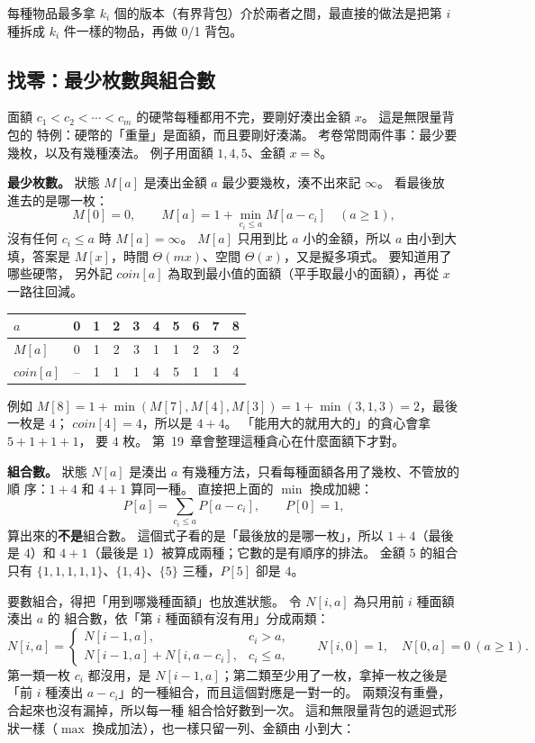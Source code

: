 每種物品最多拿 $k_i$ 個的版本（有界背包）介於兩者之間，最直接的做法是把第 $i$ 種拆成 $k_i$
件一樣的物品，再做 0/1 背包。

\subsection{找零：最少枚數與組合數}
\label{sec:dp-coin}

面額 $c_1 < c_2 < \cdots < c_m$ 的硬幣每種都用不完，要剛好湊出金額 $x$。 這是無限量背包的
特例：硬幣的「重量」是面額，而且要剛好湊滿。 考卷常問兩件事：最少要幾枚，以及有幾種湊法。
例子用面額 $1, 4, 5$、金額 $x = 8$。

\textbf{最少枚數。} 狀態 $M[a]$ 是湊出金額 $a$ 最少要幾枚，湊不出來記 $\infty$。 看最後放
進去的是哪一枚：
\[
M[0] = 0, \qquad M[a] = 1 + \min_{c_i \le a} M[a - c_i] \quad (a \ge 1),
\]
沒有任何 $c_i \le a$ 時 $M[a] = \infty$。 $M[a]$ 只用到比 $a$ 小的金額，所以 $a$ 由小到大
填，答案是 $M[x]$，時間 $\Theta(mx)$、空間 $\Theta(x)$，又是擬多項式。 要知道用了哪些硬幣，
另外記 $\mathit{coin}[a]$ 為取到最小值的面額（平手取最小的面額），再從 $x$ 一路往回減。

\begin{center}
\small
\begin{tabular}{l*{9}{c}}
\toprule
$a$ & 0 & 1 & 2 & 3 & 4 & 5 & 6 & 7 & 8 \\
\midrule
$M[a]$ & 0 & 1 & 2 & 3 & 1 & 1 & 2 & 3 & 2 \\
$\mathit{coin}[a]$ & -- & 1 & 1 & 1 & 4 & 5 & 1 & 1 & 4 \\
\bottomrule
\end{tabular}
\end{center}

例如 $M[8] = 1 + \min(M[7], M[4], M[3]) = 1 + \min(3, 1, 3) = 2$，最後一枚是 $4$；
$\mathit{coin}[4] = 4$，所以是 $4 + 4$。 「能用大的就用大的」的貪心會拿 $5 + 1 + 1 + 1$，
要 $4$ 枚。 第~19~章會整理這種貪心在什麼面額下才對。

\textbf{組合數。} 狀態 $N[a]$ 是湊出 $a$ 有幾種方法，只看每種面額各用了幾枚、不管放的順
序：$1 + 4$ 和 $4 + 1$ 算同一種。 直接把上面的 $\min$ 換成加總：
\[
P[a] = \sum_{c_i \le a} P[a - c_i], \qquad P[0] = 1,
\]
算出來的\textbf{不是}組合數。 這個式子看的是「最後放的是哪一枚」，所以 $1 + 4$（最後是
$4$）和 $4 + 1$（最後是 $1$）被算成兩種；它數的是有順序的排法。 金額 $5$ 的組合只有
$\{1, 1, 1, 1, 1\}$、$\{1, 4\}$、$\{5\}$ 三種，$P[5]$ 卻是 $4$。

要數組合，得把「用到哪幾種面額」也放進狀態。 令 $N[i, a]$ 為只用前 $i$ 種面額湊出 $a$ 的
組合數，依「第 $i$ 種面額有沒有用」分成兩類：
\[
N[i, a] = \begin{cases}
N[i - 1, a], & c_i > a, \\
N[i - 1, a] + N[i, a - c_i], & c_i \le a,
\end{cases}
\qquad N[i, 0] = 1, \quad N[0, a] = 0 \ (a \ge 1).
\]
第一類一枚 $c_i$ 都沒用，是 $N[i - 1, a]$；第二類至少用了一枚，拿掉一枚之後是「前 $i$ 種湊出
$a - c_i$」的一種組合，而且這個對應是一對一的。 兩類沒有重疊，合起來也沒有漏掉，所以每一種
組合恰好數到一次。 這和無限量背包的遞迴式形狀一樣（$\max$ 換成加法），也一樣只留一列、金額由
小到大：

